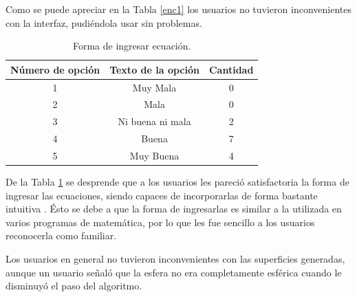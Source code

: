 \documentclass[12pt]{article}
\begin{document}
Como se puede apreciar en la Tabla \ref{enc1} los usuarios no tuvieron inconvenientes con la interfaz, pudiéndola usar sin problemas.

\begin{table}[h!]
  \centering
  \begin{tabular}{ccc}
    \toprule
    Número de opción &  Texto de la opción &Cantidad\\
    \midrule
    1 & Muy Mala & 0 \\
    2 & Mala & 0 \\
    3 & Ni buena ni mala & 2 \\
    4 & Buena & 7\\
    5 & Muy Buena & 4\\
    \bottomrule
  \end{tabular}
  \caption{Forma de ingresar ecuación.}
  \label{enc2}
\end{table}

De la Tabla \ref{enc2} se desprende que a los usuarios les pareció satisfactoria la forma de ingresar las ecuaciones, siendo capaces de incorporarlas de forma bastante intuitiva . Ésto se debe a que la forma de ingresarlas es similar a la utilizada en varios programas de matemática, por lo que les fue sencillo a los usuarios reconocerla como familiar.

Los usuarios en general no tuvieron inconvenientes con las superficies generadas, aunque un usuario señaló que la esfera no era completamente esférica cuando le disminuyó el paso del algoritmo. 
\end{document}
